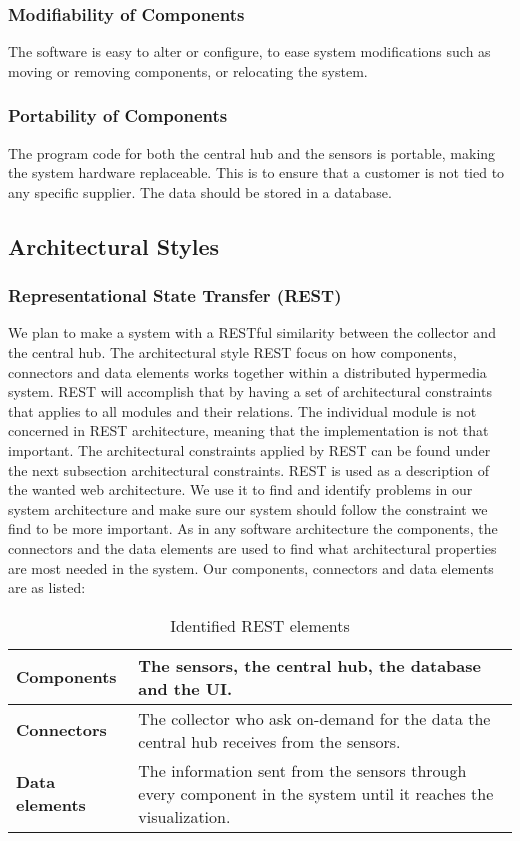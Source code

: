 \documentclass[../document.tex]{subfiles}
\begin{document}
\subsubsection{Modifiability of Components}
The software is easy to alter or configure, to ease system modifications such as moving or removing components, or relocating the system.

\subsubsection{Portability of Components}
The program code for both the central hub and the sensors is portable, making the system hardware replaceable. This is to ensure that a customer is not tied to any specific supplier. The data should be stored in a database.

\subsection{Architectural Styles}
\subsubsection{Representational State Transfer (REST)}
We plan to make a system with a RESTful similarity between the collector and the central hub. The architectural style REST focus on how components, connectors and data elements works together within a distributed hypermedia system. REST will accomplish that by having a set of architectural constraints that applies to all modules and their relations. The individual module is not concerned in REST architecture, meaning that the implementation is not that important. The architectural constraints applied by REST can be found under the next subsection architectural constraints. REST is used as a description of the wanted web architecture. We use it to find and identify problems in our system architecture and make sure our system should follow the constraint we find to be more important. As in any software architecture the components, the connectors and the data elements are used to find what architectural properties are most needed in the system. Our components, connectors and data elements are as listed:

\begin{table}[H]
	\caption{Identified REST elements}
	\begin{tabularx}{\textwidth}{|X|X|}
		\hline
		\textbf{Components}		& The sensors, the central hub, the database and the UI.  \\ \hline
		\textbf{Connectors}		& The collector who ask on-demand for the data the central hub receives from the sensors.  \\ \hline
		\textbf{Data elements}	& The information sent from the sensors through every component in the system until it reaches  the visualization.  \\ \hline
	\end{tabularx}
\end{table}
\end{document}
